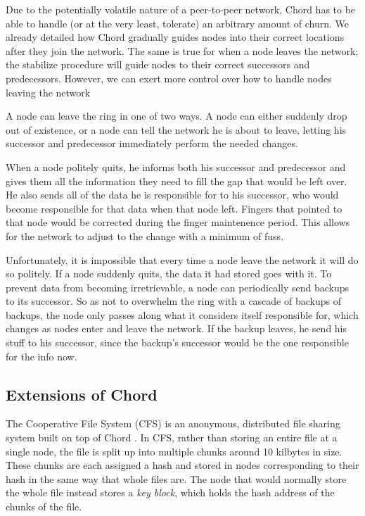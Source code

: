 \documentclass[conference, compsocconf, letterpaper]{IEEEtran}
\begin{document}
Due to the potentially volatile nature of a peer-to-peer network, Chord has to be able to handle (or at the very least, tolerate) an arbitrary amount of churn.  We already detailed how Chord gradually guides nodes into their correct locations after they join the network.  The same is true for when a node leaves the network; the stabilize procedure will guide nodes to their correct successors and predecessors.  However, we can exert more control over how to handle nodes leaving the network

A node can leave the ring in one of two ways.  A node can either suddenly drop out of existence, or a node can tell the network he is about to leave, letting his successor and predecessor immediately perform the needed changes.

When a node politely quits, he informs both his successor and predecessor and gives them all the information they need to fill the gap that would be left over. He also sends all of the data he is responsible for to his successor, who would become responsible for that data when that node left.  Fingers that pointed to that node would be corrected during the finger maintenence period.  This allows for the network to adjust to the change with a minimum of fuss.

Unfortunately, it is impossible that every time a node leave the network it will do so politely.  If a node suddenly quits, the data it had stored goes with it. To prevent data from becoming irretrievable, a node can periodically send backups to its successor.  So as not to overwhelm the ring with a cascade of backups of backups, the node only passes along what it considers itself responsible for, which changes as nodes enter and leave the network.  If the backup leaves, he send his stuff to his successor, since the backup's successor would be the one responsible for the info now. 


\subsection{Extensions of Chord}


The Cooperative File System (CFS) is an anonymous, distributed file sharing system built on top of Chord \cite{CFS}.  In CFS, rather than storing an entire file at a single node, the file is split up into multiple chunks around 10 kilbytes in size.  These chunks are each assigned a hash and stored in nodes corresponding to their hash in the same way that whole files are.  The node that would normally store the whole file instead stores a \emph{key block}, which holds the hash address of the chunks of the file. 
\end{document}
